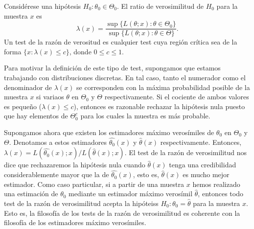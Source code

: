         \begin{definition}
            Considérese una hipótesis $H_0 : \theta_0 \in \Theta_0$. El ratio de verosimilitud de $H_0$ para la muestra $x$ es
            \[\lambda(x) = \frac{\sup\{L(\theta; x): \theta \in \Theta_0\}}{\sup\{L(\theta; x): \theta \in \Theta\}}. \]
             Un test de la razón de verositud es cualquier test cuya región crítica sea de la forma $\{x : \lambda(x) \le c\}$, donde $0 \le c \le 1$.
        \end{definition}

        Para motivar la definición de este tipo de test, supongamos que estamos trabajando con distribuciones discretas. En tal caso, tanto el numerador como el denominador de $\lambda(x)$ se corresponden con la máxima probabilidad posible de la muestra $x$ si variaos $\theta$ en $\Theta_0$ y $\Theta$ respectivamente. Si el cociente de ambos valores es pequeño ($\lambda(x) \le c$), entonces es razonable rechazar la hipótesis nula puesto que hay elementos de $\Theta_0^c$ para los cuales la muestra es más probable.

        Supongamos ahora que existen los estimadores máximo verosímiles de $\theta_0$ en $\Theta_0$ y $\Theta$. Denotamos a estos estimadores $\hat{\theta_0}(x)$ y $\hat{\theta}(x)$ respectivamente. Entonces, $\lambda(x) = L(\hat{\theta_0}(x);x) / L(\hat{\theta}(x);x)$. El test de la razón de verosimilitud nos dice que rechazaremos la hipótesis nula cuando $\hat{\theta}(x)$  tenga una credibilidad considerablemente mayor que la de $\hat{\theta_0}(x)$, esto es, $\hat{\theta}(x)$ es mucho mejor estimador. Como caso particular, si a partir de una muestra $x$ hemos realizado una estimación de $\theta_0$ mediante un estimador máximo verosímil $\hat{\theta}$, entonces todo test de la razón de verosimilitud acepta la hipóteiss $H_0: \theta_0 = \hat{\theta}$ para la muestra $x$. Esto es, la filosofía de los tests de la razón de verosimilitud es coherente con la filosofía de los estimadores máximo verosímiles.
